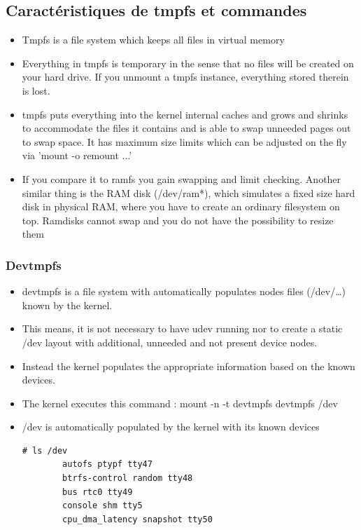 \documentclass[resume]{subfiles}
\begin{document}
\subsection{Caractéristiques de tmpfs et commandes}
\begin{itemize}
    \item Tmpfs is a file system which keeps all files in virtual memory
    \item Everything in tmpfs is temporary in the sense that no files will be created on your hard drive. If you unmount a tmpfs instance, everything stored therein is lost.
    \item tmpfs puts everything into the kernel internal caches and grows and shrinks to accommodate the files it contains and is able to swap unneeded pages out to swap space. It has maximum size limits which can be adjusted on the fly via 'mount -o remount ...’
    \item If you compare it to ramfs you gain swapping and limit checking. Another similar thing is the RAM disk (/dev/ram*), which simulates a fixed size hard disk in physical RAM, where you have to create an ordinary filesystem on top. Ramdisks cannot swap and you do not have the possibility to resize them
\end{itemize}

\subsubsection{Devtmpfs}
\begin{itemize}
    \item devtmpfs is a file system with automatically populates nodes files (/dev/…) known by the kernel.
    \item This means, it is not necessary to have udev running nor to create a static /dev layout with additional, unneeded and not present device nodes.
    \item Instead the kernel populates the appropriate information based on the known devices.
    \item The kernel executes this command : mount -n -t devtmpfs devtmpfs /dev
    \item /dev is automatically populated by the kernel with its known devices
    \begin{lstlisting}[style=console,label={},caption={}]
        # ls /dev
        autofs ptypf tty47
        btrfs-control random tty48
        bus rtc0 tty49
        console shm tty5
        cpu_dma_latency snapshot tty50
    \end{lstlisting}
\end{itemize}
\end{document}
